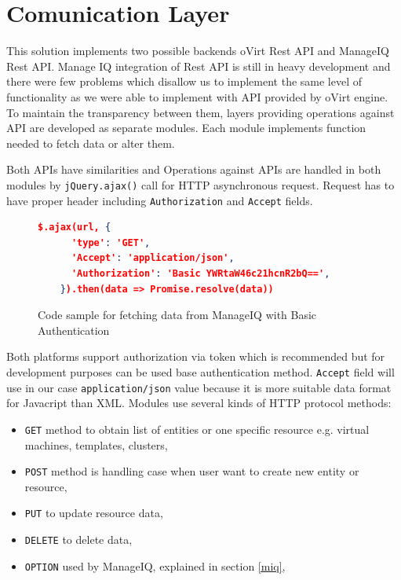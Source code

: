 \section{Comunication Layer}
This solution implements two possible backends oVirt Rest API and ManageIQ Rest API. Manage IQ integration of Rest API is still in heavy development and there were few problems which disallow us to implement the same level of functionality as we were able to implement with API provided by oVirt engine. To maintain the transparency between them, layers providing operations against API are developed as separate modules. Each module implements function needed to fetch data or alter them.

Both APIs have similarities and Operations against APIs are handled in both modules by \texttt{jQuery.ajax()}\cite{ajax} call for HTTP asynchronous request.
Request has to have proper header including \texttt{Authorization} and \texttt{Accept} fields. 



\begin{figure}[h]
\begin{lstlisting}[language=json]
$.ajax(url, {
      'type': 'GET',
      'Accept': 'application/json',
      'Authorization': 'Basic YWRtaW46c21hcnR2bQ==',
    }).then(data => Promise.resolve(data))
\end{lstlisting}
\caption{Code sample for fetching data from ManageIQ with Basic Authentication}
\label{vector}
\end{figure}

Both platforms support authorization via token which is recommended but for development purposes can be used base authentication method.
\texttt{Accept} field will use in our case \texttt{application/json} value because it is more suitable data format for Javacript than XML. Modules use several kinds of HTTP protocol methods: 
\begin{itemize}
\item \texttt{GET} method to obtain list of entities or one specific resource e.g. virtual machines, templates, clusters,
\item \texttt{POST} method is handling case when user want to create new entity or resource,
\item \texttt{PUT} to update resource data,
\item \texttt{DELETE} to delete data,
\item \texttt{OPTION} used by ManageIQ, explained in section \ref{miq},
\end{itemize}

